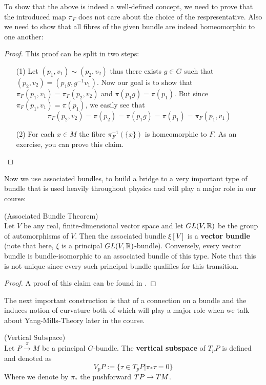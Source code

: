 To show that the above is indeed a well-defined concept, we need to prove that the introduced map $\pi_F$ does not care about the choice of the respresentative. Also we need to show that all fibres of the given bundle are indeed homeomorphic to one another:
\begin{proof} This proof can be split in two steps:
\begin{itemize}
  \item[(1)] Let $(p_1, v_1) \sim (p_2, v_2)$ thus there exists $g \in G$ such that $(p_2, v_2) = (p_1g, g^{-1}v_1)$. Now our goal is to show that $\pi_F(p_1, v_1) = \pi_F(p_2, v_2)$ and $\pi(p_1 g) = \pi(p_1)$. But since $\pi_F(p_1, v_1) = \pi(p_1)$, we easily see that
  $$ \pi_F(p_2,v_2) = \pi(p_2) = \pi(p_1g) = \pi(p_1) = \pi_F(p_1,v_1) $$

  \item[(2)] For each $x\in M$ the fibre $\pi_F^{-1}(\{x\})$ is homeomorphic to $F$. As an exercise, you can prove this claim.
\end{itemize}
\end{proof}


Now we use associated bundles, to build a bridge to a very important type of bundle that is used heavily throughout physics and will play a major role in our course:

\begin{theo} (Associated Bundle Theorem)\\
  Let $V$ be any real, finite-dimensional vector space and let $GL(V,\mathbb{R})$ be the group of automorphisms of $V$. Then the associated bundle $\xi[V]$ is a \textbf{vector bundle} (note that here, $\xi$ is a principal $GL(V, \mathbb{R})$-bundle). Conversely, every vector bundle is bundle-isomorphic to an associated bundle of this type. Note that this is not unique since every such principal bundle qualifies for this transition.
\begin{proof}
  A proof of this claim can be found in .
\end{proof}
\end{theo}

The next important construction is that of a connection on a bundle and the induces notion of curvature both of which will play a major role when we talk about Yang-Mills-Theory later in the course.

\begin{definition}
\label{Vertical_subspace}
(Vertical Subspace)\\
  Let $P \overset{\pi}{\longrightarrow} M$ be a principal $G$-bundle. The \textbf{vertical subspace} of $T_pP$ is defined and denoted as
  $$ V_pP:= \{ \tau \in T_pP | \pi_* \tau = 0 \} $$
  Where we denote by $\pi_*$ the pushforward $TP \rightarrow TM$.
\end{definition}

